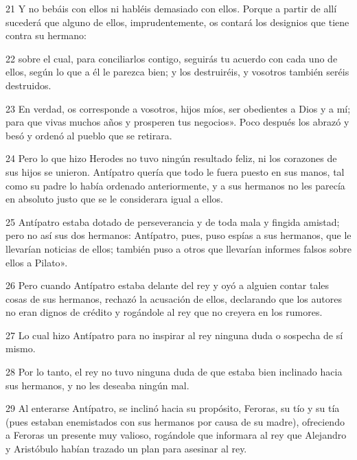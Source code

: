 \par 21 Y no bebáis con ellos ni habléis demasiado con ellos. Porque a partir de allí sucederá que alguno de ellos, imprudentemente, os contará los designios que tiene contra su hermano:

\par 22 sobre el cual, para conciliarlos contigo, seguirás tu acuerdo con cada uno de ellos, según lo que a él le parezca bien; y los destruiréis, y vosotros también seréis destruidos.

\par 23 En verdad, os corresponde a vosotros, hijos míos, ser obedientes a Dios y a mí; para que vivas muchos años y prosperen tus negocios». Poco después los abrazó y besó y ordenó al pueblo que se retirara.

\par 24 Pero lo que hizo Herodes no tuvo ningún resultado feliz, ni los corazones de sus hijos se unieron. Antípatro quería que todo le fuera puesto en sus manos, tal como su padre lo había ordenado anteriormente, y a sus hermanos no les parecía en absoluto justo que se le considerara igual a ellos.

\par 25 Antípatro estaba dotado de perseverancia y de toda mala y fingida amistad; pero no así sus dos hermanos: Antípatro, pues, puso espías a sus hermanos, que le llevarían noticias de ellos; también puso a otros que llevarían informes falsos sobre ellos a Pilato».

\par 26 Pero cuando Antípatro estaba delante del rey y oyó a alguien contar tales cosas de sus hermanos, rechazó la acusación de ellos, declarando que los autores no eran dignos de crédito y rogándole al rey que no creyera en los rumores.

\par 27 Lo cual hizo Antípatro para no inspirar al rey ninguna duda o sospecha de sí mismo.

\par 28 Por lo tanto, el rey no tuvo ninguna duda de que estaba bien inclinado hacia sus hermanos, y no les deseaba ningún mal.

\par 29 Al enterarse Antípatro, se inclinó hacia su propósito, Feroras, su tío y su tía (pues estaban enemistados con sus hermanos por causa de su madre), ofreciendo a Feroras un presente muy valioso, rogándole que informara al rey que Alejandro y Aristóbulo habían trazado un plan para asesinar al rey.

